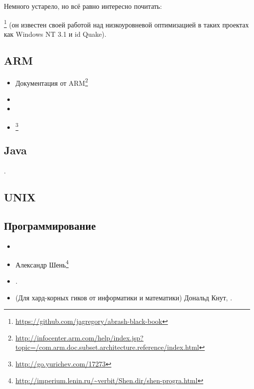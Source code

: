 Немного устарело, но всё равно интересно почитать:

\MAbrash\footnote{\AlsoAvailableAs \url{https://github.com/jagregory/abrash-black-book}}
(он известен своей работой над низкоуровневой оптимизацией в таких проектах как Windows NT 3.1 и id Quake).

\subsection{ARM}

\begin{itemize}
\item Документация от ARM\footnote{\AlsoAvailableAs \url{http://infocenter.arm.com/help/index.jsp?topic=/com.arm.doc.subset.architecture.reference/index.html}}

\item \ARMSevenRef

\item \ARMSixFourRefURL

\item \ARMCookBook\footnote{\AlsoAvailableAs \url{http://go.yurichev.com/17273}}
\end{itemize}

\subsection{Java}

\JavaBook.

\subsection{UNIX}

\TAOUP

\subsection{Программирование}

\begin{itemize}

\item \RobPikePractice

\item Александр Шень\footnote{\url{http://imperium.lenin.ru/~verbit/Shen.dir/shen-progra.html}}

\item \HenryWarren.

\item (Для хард-корных гиков от информатики и математики) Дональд Кнут, .

\end{itemize}


